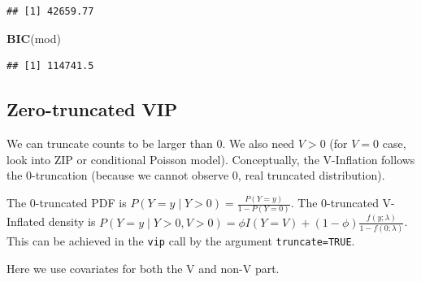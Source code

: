 \documentclass[]{article}
\newenvironment{Shaded}{\begin{snugshade}}{\end{snugshade}}
\newcommand{\KeywordTok}[1]{\textcolor[rgb]{0.13,0.29,0.53}{\textbf{#1}}}
\newcommand{\NormalTok}[1]{#1}
\begin{document}
\begin{verbatim}
## [1] 42659.77
\end{verbatim}

\begin{Shaded}
\begin{Highlighting}[]
\KeywordTok{BIC}\NormalTok{(mod)}
\end{Highlighting}
\end{Shaded}

\begin{verbatim}
## [1] 114741.5
\end{verbatim}

\subsection{Zero-truncated VIP}\label{zero-truncated-vip}

We can truncate counts to be larger than 0. We also need \(V>0\) (for
\(V=0\) case, look into ZIP or conditional Poisson model). Conceptually,
the V-Inflation follows the 0-truncation (because we cannot observe 0,
real truncated distribution).

The 0-truncated PDF is \(P(Y=y \mid Y>0) = \frac{P(Y=y)}{1 - P(Y=0)}\).
The 0-truncated V-Inflated density is
\(P(Y=y \mid Y>0,V>0) = \phi I(Y=V) + (1-\phi) \frac{f(y; \lambda)}{1-f(0; \lambda)}\).
This can be achieved in the \texttt{vip} call by the argument
\texttt{truncate=TRUE}.

Here we use covariates for both the V and non-V part.
\end{document}
